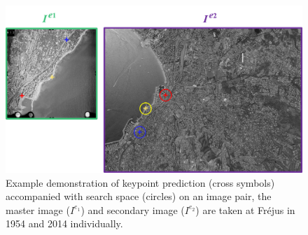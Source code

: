 \begin{figure}[htbp]
	\begin{center}
				\centering
				\includegraphics[width=1\columnwidth]{images/Chapitre4/guidedexample.png}
		\caption{Example demonstration of keypoint prediction (cross symbols) accompanied with search space (circles) on an image pair, the master image ($I^{e_1}$) and secondary image ($I^{e_2}$) are taken at Fr{\'e}jus in 1954 and 2014 individually.}
		\label{guidedexample}
	\end{center}
\end{figure}

